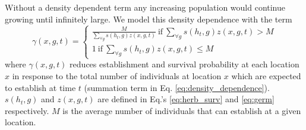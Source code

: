 \documentclass[12pt, a4paper]{article}
\begin{document}
Without a density dependent term any increasing population would continue growing until infinitely large. We model this density dependence with the term 
\begin{equation}\label{eq:density_dependence}
	\gamma(x, g, t) =
		\begin{cases}
			\frac{M}{\sum_{\forall g}s(h_t, g)z(x, g, t)} ~\text{if}~ \sum_{\forall g}s(h_t, g)z(x, g, t) > M \\
			1 ~\text{if}~ \sum_{\forall g}s(h_t, g)z(x, g, t) \leq M  
		\end{cases}
\end{equation}
where $\gamma(x, g, t)$ reduces establishment and survival probability at each location $x$ in response to the total number of individuals at location $x$ which are expected to establish at time $t$ (summation term in Eq. \ref{eq:density_dependence}). $s(h_t, g)$ and $z(x, g, t)$ are defined in Eq.'s \ref{eq:herb_surv} and \ref{eq:germ} respectively. $M$ is the average number of individuals that can establish at a given location. 

 

\end{document}

